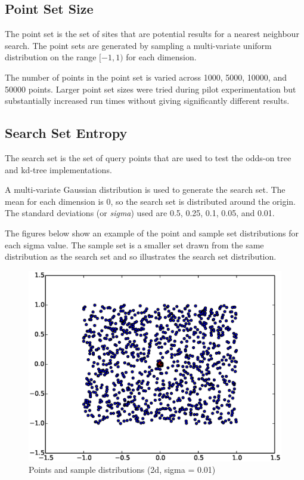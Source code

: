 \documentclass[mcs]{scsthesis}
\begin{document}
\subsection{Point Set Size}

The point set is the set of sites that are potential results for a nearest
neighbour search. The point sets are generated by sampling a multi-variate
uniform distribution on the range \([-1, 1)\) for each dimension.

The number of points in the point set is varied across 1000, 5000, 10000, and
50000 points. Larger point set sizes were tried during pilot experimentation but
substantially increased run times without giving significantly different
results.

\subsection{Search Set Entropy}

The search set is the set of query points that are used to test the odds-on
tree and kd-tree implementations.

A multi-variate Gaussian distribution is used to generate the search set. The
mean for each dimension is 0, so the search set is distributed around the
origin. The standard deviations (or \emph{sigma}) used are 0.5, 0.25, 0.1, 0.05,
and 0.01.

The figures below show an example of the point and sample set distributions for
each sigma value. The sample set is a smaller set drawn from the same
distribution as the search set and so illustrates the search set distribution.

\begin{figure}
\begin{center}
\includegraphics[scale=0.5]{diagrams/pts_plot_sigma0.01.eps}
\caption{Points and sample distributions (2d, sigma = 0.01)}
\label{fig:points_and_sample_2d_0_01}
\end{center}
\end{figure}
\end{document}
